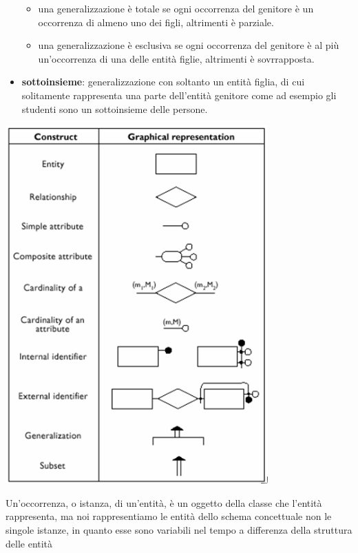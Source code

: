 \documentclass[a4paper,12pt, oneside]{book}
\begin{document}
\begin{itemize}
          \begin{itemize}
            \item una generalizzazione è totale se ogni occorrenza del genitore è un occorrenza di almeno
                  uno dei figli, altrimenti è parziale.
            \item una generalizzazione è esclusiva se ogni occorrenza del genitore è al più un'occorrenza 
                  di una delle entità figlie, altrimenti è sovrrapposta.
          \end{itemize}
  \item \textbf{sottoinsieme}: generalizzazione con soltanto un entità figlia, di cui solitamente rappresenta una parte 
            dell'entità genitore come ad esempio gli studenti sono un sottoinsieme delle persone.
\end{itemize}

\begin{center}
\includegraphics[scale=0.8]{img/bas6.png}
\end{center}
Un'occorrenza, o istanza, di un'entità, è un oggetto della classe che l'entità rappresenta,
ma noi rappresentiamo le entità dello schema concettuale non le singole istanze, in quanto esse
sono variabili nel tempo a differenza della struttura delle entità
\end{document}

